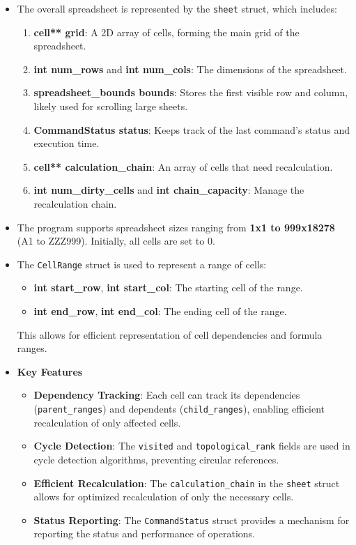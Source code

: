 \documentclass{article}
\begin{document}
\begin{itemize}
    \item The overall spreadsheet is represented by the \texttt{sheet} struct, which includes:
    \begin{enumerate}
        \item \textbf{cell** grid}: A 2D array of cells, forming the main grid of the spreadsheet.
        \item \textbf{int num\_rows} and \textbf{int num\_cols}: The dimensions of the spreadsheet.
        \item \textbf{spreadsheet\_bounds bounds}: Stores the first visible row and column, likely used for scrolling large sheets.
        \item \textbf{CommandStatus status}: Keeps track of the last command's status and execution time.
        \item \textbf{cell** calculation\_chain}: An array of cells that need recalculation.
        \item \textbf{int num\_dirty\_cells} and \textbf{int chain\_capacity}: Manage the recalculation chain.
    \end{enumerate}
    
    \item The program supports spreadsheet sizes ranging from \textbf{1x1 to 999x18278} (A1 to ZZZ999). Initially, all cells are set to 0.

    \item The \texttt{CellRange} struct is used to represent a range of cells:
    \begin{itemize}
        \item \textbf{int start\_row}, \textbf{int start\_col}: The starting cell of the range.
        \item \textbf{int end\_row}, \textbf{int end\_col}: The ending cell of the range.
    \end{itemize}
    This allows for efficient representation of cell dependencies and formula ranges.

    \item \textbf{Key Features}
    \begin{itemize}
        \item \textbf{Dependency Tracking}: Each cell can track its dependencies (\texttt{parent\_ranges}) and dependents (\texttt{child\_ranges}), enabling efficient recalculation of only affected cells.
        \item \textbf{Cycle Detection}: The \texttt{visited} and \texttt{topological\_rank} fields are used in cycle detection algorithms, preventing circular references.
        \item \textbf{Efficient Recalculation}: The \texttt{calculation\_chain} in the \texttt{sheet} struct allows for optimized recalculation of only the necessary cells.
        \item \textbf{Status Reporting}: The \texttt{CommandStatus} struct provides a mechanism for reporting the status and performance of operations.
    \end{itemize}
\end{itemize}
\end{document}
